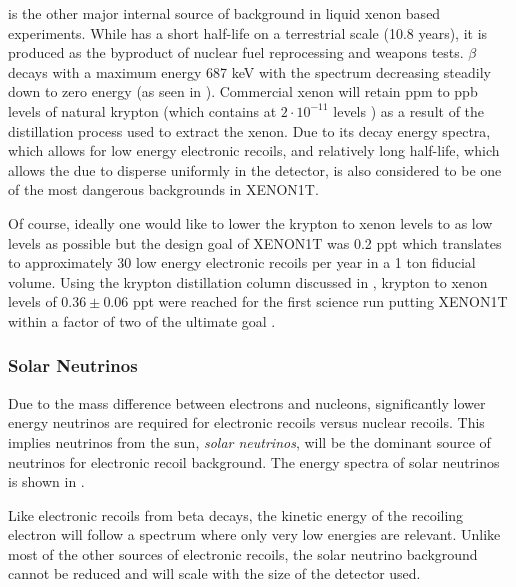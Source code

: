 \krypton{} is the other major internal source of background in liquid xenon based experiments.  While \krypton{} has a short half-life on a terrestrial scale (10.8 years), it is produced as the byproduct of nuclear fuel reprocessing and weapons tests.  \krypton{} $\beta$ decays with a maximum energy 687 keV with the spectrum decreasing steadily down to zero energy (as seen in ).  Commercial xenon will retain ppm to ppb levels of natural krypton (which contains \krypton{} at $2 \cdot 10^{-11}$ levels \cite{du2004atom}) as a result of the distillation process used to extract the xenon.  Due to its decay energy spectra, which allows for low energy electronic recoils, and relatively long half-life, which allows the \krypton{} due to disperse uniformly in the detector, \krypton{} is also considered to be one of the most dangerous backgrounds in XENON1T.  

Of course, ideally one would like to lower the krypton to xenon levels to as low levels as possible but the design goal of XENON1T was 0.2 ppt which translates to approximately 30 low energy electronic recoils per year in a 1 ton fiducial volume.  Using the krypton distillation column discussed in , krypton to xenon levels of $0.36 \pm 0.06$ ppt were reached for the first science run putting XENON1T within a factor of two of the ultimate goal \cite{aprile2017xenon1t}.


\subsubsection{Solar Neutrinos}
\label{sec:xe1t_er_bkg_neutrinos}

Due to the mass difference between electrons and nucleons, significantly lower energy neutrinos are required for electronic recoils versus nuclear recoils.  This implies neutrinos from the sun, \textit{solar neutrinos}, will be the dominant source of neutrinos for electronic recoil background.  The energy spectra of solar neutrinos is shown in .  

Like electronic recoils from beta decays, the kinetic energy of the recoiling electron will follow a spectrum where only very low energies are relevant.  Unlike most of the other sources of electronic recoils, the solar neutrino background cannot be reduced and will scale with the size of the detector used.


\subsubsection{\radioxenon}


